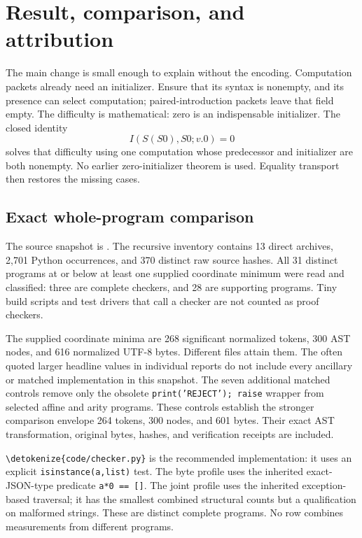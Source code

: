\documentclass[11pt,letterpaper]{article}
\theoremstyle{definition}\newtheorem{definition}[theorem]{Definition}
\theoremstyle{remark}\newtheorem{remark}[theorem]{Remark}
\newcommand{\file}[1]{\expandafter\nolinkurl\expandafter{\detokenize{#1}}}
\begin{document}
\section{Result, comparison, and attribution}
\label{sec:result}

The main change is small enough to explain without the encoding.
Computation packets already need an initializer. Ensure that its syntax
is nonempty, and its presence can select computation; paired-introduction
packets leave that field empty. The difficulty is mathematical: zero is
an indispensable initializer. The closed identity
\[
                  \boxed{I(S(S0),S0;v.0)=0}
\]
solves that difficulty using one computation whose predecessor and
initializer are both nonempty. No earlier zero-initializer theorem is
used. Equality transport then restores the missing cases.

\subsection{Exact whole-program comparison}

The source snapshot is \cite{corpus}. The recursive inventory contains
13 direct archives, 2,701 Python occurrences, and 370 distinct raw source
hashes. All 31 distinct programs at or below at least one supplied
coordinate minimum were read and classified: three are complete
checkers, and 28 are supporting programs. Tiny build scripts and test
drivers that call a checker are not counted as proof checkers.

The supplied coordinate minima are 268 significant normalized tokens,
300 AST nodes, and 616 normalized UTF-8 bytes. Different files attain
them. The often quoted larger headline values in individual reports do
not include every ancillary or matched implementation in this snapshot.
The seven additional matched controls remove only the obsolete
\texttt{print('REJECT'); raise} wrapper from selected affine and arity
programs. These controls establish the stronger comparison envelope
264 tokens, 300 nodes, and 601 bytes. Their exact AST transformation,
original bytes, hashes, and verification receipts are included.



\file{code/checker.py} is the recommended implementation: it uses an
explicit \texttt{isinstance(a,list)} test. The byte profile uses the
inherited exact-JSON-type predicate \texttt{a*0 == []}. The joint profile
uses the inherited exception-based traversal; it has the smallest
combined structural counts but a qualification on malformed strings.
These are distinct complete programs. No row combines measurements
from different programs.
\end{document}
